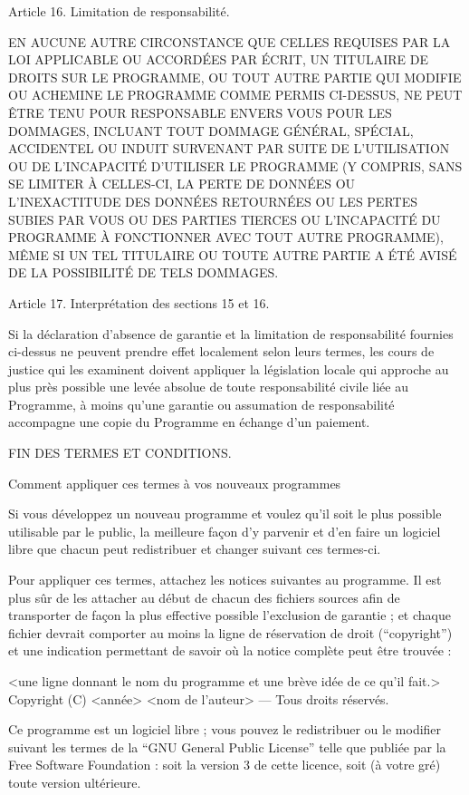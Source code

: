 {Article 16. Limitation de responsabilité.

EN AUCUNE AUTRE CIRCONSTANCE QUE CELLES REQUISES PAR LA LOI APPLICABLE
OU ACCORDÉES PAR ÉCRIT, UN TITULAIRE DE DROITS SUR LE PROGRAMME, OU
TOUT AUTRE PARTIE QUI MODIFIE OU ACHEMINE LE PROGRAMME COMME PERMIS
CI-DESSUS, NE PEUT ÊTRE TENU POUR RESPONSABLE ENVERS VOUS POUR LES
DOMMAGES, INCLUANT TOUT DOMMAGE GÉNÉRAL, SPÉCIAL, ACCIDENTEL OU INDUIT
SURVENANT PAR SUITE DE L’UTILISATION OU DE L’INCAPACITÉ D’UTILISER LE
PROGRAMME (Y COMPRIS, SANS SE LIMITER À CELLES-CI, LA PERTE DE DONNÉES
OU L’INEXACTITUDE DES DONNÉES RETOURNÉES OU LES PERTES SUBIES PAR VOUS
OU DES PARTIES TIERCES OU L’INCAPACITÉ DU PROGRAMME À FONCTIONNER AVEC
TOUT AUTRE PROGRAMME), MÊME SI UN TEL TITULAIRE OU TOUTE AUTRE PARTIE
A ÉTÉ AVISÉ DE LA POSSIBILITÉ DE TELS DOMMAGES.


Article 17. Interprétation des sections 15 et 16.

Si la déclaration d’absence de garantie et la limitation de
responsabilité fournies ci-dessus ne peuvent prendre effet localement
selon leurs termes, les cours de justice qui les examinent doivent
appliquer la législation locale qui approche au plus près possible une
levée absolue de toute responsabilité civile liée au Programme, à moins
qu’une garantie ou assumation de responsabilité accompagne une copie du
Programme en échange d’un paiement.


FIN DES TERMES ET CONDITIONS.



Comment appliquer ces termes à vos nouveaux programmes

Si vous développez un nouveau programme et voulez qu’il soit le plus
possible utilisable par le public, la meilleure façon d’y parvenir et
d’en faire un logiciel libre que chacun peut redistribuer et changer
suivant ces termes-ci.

Pour appliquer ces termes, attachez les notices suivantes au programme.
Il est plus sûr de les attacher au début de chacun des fichiers sources
afin de transporter de façon la plus effective possible l’exclusion de
garantie ; et chaque fichier devrait comporter au moins la ligne de
réservation de droit (“copyright”) et une indication permettant de savoir
où la notice complète peut être trouvée :

  <une ligne donnant le nom du programme et une brève idée de ce qu’il fait.>
  Copyright (C) <année> <nom de l’auteur> — Tous droits réservés.

  Ce programme est un logiciel libre ; vous pouvez le redistribuer ou le
  modifier suivant les termes de la “GNU General Public License” telle que
  publiée par la Free Software Foundation : soit la version 3 de cette
  licence, soit (à votre gré) toute version ultérieure.

}
